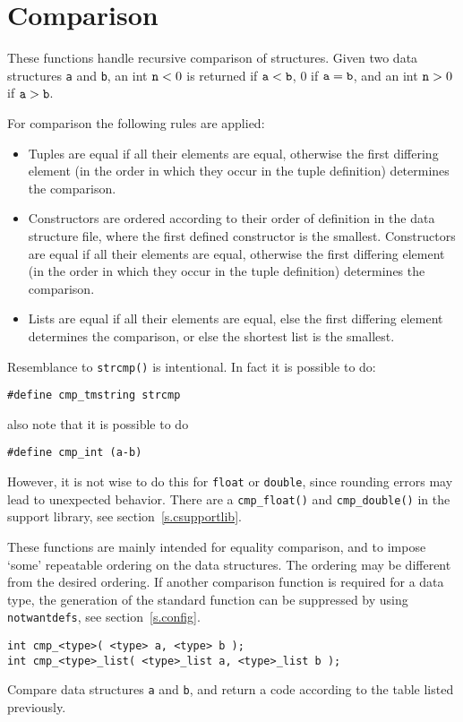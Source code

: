 \section{Comparison}
These functions handle recursive comparison of structures.
Given two data structures {\tt a} and {\tt b},
an int ${\tt n}<0$ is returned if ${\tt a}<{\tt b}$,
0 if ${\tt a}={\tt b}$,
and an int ${\tt n}>0$ if ${\tt a}>{\tt b}$.
\par
For comparison the following rules are applied:
\begin{itemize}
\item
Tuples are equal if all their elements are equal,
otherwise the first differing element (in the order in which they occur in
the tuple definition) determines the comparison.
\item
Constructors are ordered according to their order of definition in the
data structure file,
where the first defined constructor is the smallest.
Constructors are equal if all their elements are equal,
otherwise the first differing element (in the order in which they occur
in the tuple definition) determines the comparison.
\item
Lists are equal if all their elements are equal,
else the first differing element determines the comparison,
or else the shortest list is the smallest.
\end{itemize}
\par
Resemblance to {\tt strcmp()} is intentional. In fact it is possible to do:
\begin{verbatim}
#define cmp_tmstring strcmp
\end{verbatim}
also note that it is possible to do
\begin{verbatim}
#define cmp_int (a-b)
\end{verbatim}
However, it is not wise to do this for {\tt float} or {\tt double},
since rounding errors may lead to unexpected behavior.
There are a {\tt cmp\_float()} and {\tt cmp\_double()} in the support library,
see section~\ref{s.csupportlib}.
\par
These functions are mainly intended for equality comparison,
and to impose `some' repeatable ordering on the data structures.
The ordering may be different from the desired ordering.
If another comparison function is required for a data type,
the generation of the standard function can be suppressed by
using {\tt notwantdefs}, see section~\ref{s.config}.
\begin{verbatim}
int cmp_<type>( <type> a, <type> b );
int cmp_<type>_list( <type>_list a, <type>_list b );
\end{verbatim}
\begin{desc}
Compare data structures {\tt a} and {\tt b}, and return a code
according to the table listed previously.
\end{desc}
